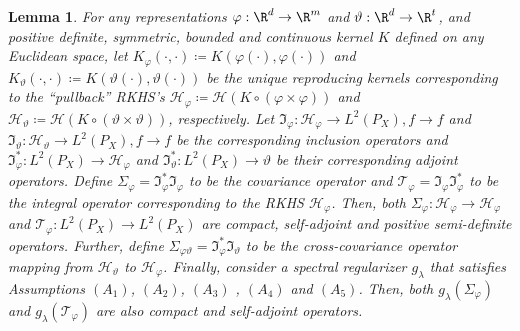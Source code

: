 \documentclass{article} %
\newcommand{\I}{\mathfrak{I}}
\newcommand{\Hil}{\mathcal{H}}
\newcommand{\rep}{\varphi}
\newcommand{\Hrep}{\mathcal{H}_{\varphi}}
\newcommand{\Srep}{\Sigma_{\rep}}
\newcommand{\Trep}{\mathcal{T}_{\rep}}
\newcommand{\Irep}{\I_{\rep}}
\newcommand{\Irepad}{\Irep^{*}}
\newcommand{\gl}{g_{\lambda}}
\newcommand{\LPtwo}{L^{2}(P_{X})}
\newcommand{\SpectralAssumptionone}{A_{1}}
\newcommand{\SpectralAssumptiontwo}{A_{2}}
\newcommand{\SpectralAssumptionthree}{A_{3}}
\newcommand{\SpectralAssumptionfour}{A_{4}}
\newcommand{\SpectralAssumptionfive}{A_{5}}
\theoremstyle{plain}
\newcounter{lemmano}
\newtheorem{lemma}[lemmano]{Lemma}
\begin{document}
\begin{lemma}\label{Elementary properties of inclusion, covariance and integral operators}
    For any representations $\rep : \R^d \to \R^m$ and $\vartheta: \R^d \to \R^t$, and positive definite, symmetric, bounded and continuous kernel $K$ defined on any Euclidean space, let $K_{\rep}(\cdot,\cdot) \coloneq K(\rep(\cdot),\rep(\cdot))$ and $K_{\vartheta}(\cdot,\cdot) \coloneq K(\vartheta(\cdot),\vartheta(\cdot))$ be the unique reproducing kernels corresponding to the ``pullback'' RKHS's $\Hrep \coloneq \Hil\left(K \circ \left(\rep \times \rep\right)\right)$ and $\mathcal{H}_{\vartheta} \coloneq \Hil\left(K \circ \left(\vartheta \times \vartheta\right)\right)$, respectively. Let $\Irep: \Hrep \to \LPtwo, f \to f$ and $\mathfrak{I}_{\vartheta}: \mathcal{H}_{\vartheta} \to \LPtwo, f \to f$ be the corresponding inclusion operators and $\Irepad:\LPtwo \to \Hrep$ and $\mathfrak{I}_{\vartheta}^{*}:\LPtwo \to \mathcal{\vartheta}$ be their corresponding adjoint operators. Define $\Srep =\Irepad\Irep$ to be the covariance operator and $\Trep = \Irep \Irepad$ to be the integral operator corresponding to the RKHS $\Hrep$. Then, both $\Srep: \Hrep \to \Hrep$ and $\Trep: \LPtwo \to \LPtwo$ are compact, self-adjoint and positive semi-definite operators. Further, define $\Sigma_{\rep\vartheta} = \Irepad\mathfrak{I}_{\vartheta}$ to be the cross-covariance operator mapping from $\mathcal{H}_{\vartheta}$ to $\Hrep$. Finally, consider a spectral regularizer $\gl$ that satisfies Assumptions \hyperref[Assumption Spectral Regularizer A1]{$(\SpectralAssumptionone)$}, \hyperref[Assumption Spectral Regularizer A2]{$(\SpectralAssumptiontwo)$}, \hyperref[Assumption Spectral Regularizer A3]{$(\SpectralAssumptionthree)$} , \hyperref[Assumption Spectral Regularizer A4]{$(\SpectralAssumptionfour)$} and \hyperref[Assumption Spectral Regularizer A5]{$(\SpectralAssumptionfive)$}. Then, both $\gl(\Srep)$ and $\gl(\Trep)$ are also compact and self-adjoint operators.
    

\end{lemma}
\end{document}
